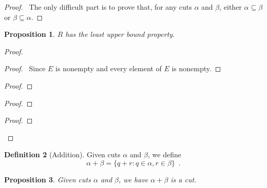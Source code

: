 \documentclass{book}
\let\qed\relax
\newtheorem{prop}{Proposition}[chapter]
\theoremstyle{definition}
\newtheorem{df}[prop]{Definition}
\begin{document}
\begin{proof}
\pf\ The only difficult part is to prove that, for any cuts $\alpha$ and $\beta$, either $\alpha \subseteq \beta$ or $\beta \subseteq \alpha$.
\qed
\end{proof}

\begin{prop}
$R$ has the least upper bound property.
\end{prop}

\begin{proof}
\pf
{}
\begin{proof}
	\pf\ Since $E$ is nonempty and every element of $E$ is nonempty.
\end{proof}
\begin{proof}
\end{proof}
\begin{proof}
\end{proof}
\begin{proof}
\end{proof}
\qed
\end{proof}

\begin{df}[Addition]
Given cuts $\alpha$ and $\beta$, we define
\[ \alpha + \beta = \{ q + r : q \in \alpha, r \in \beta \} \enspace . \]
\end{df}

\begin{prop}
Given cuts $\alpha$ and $\beta$, we have $\alpha + \beta$ is a cut.
\end{prop}
\end{document}
